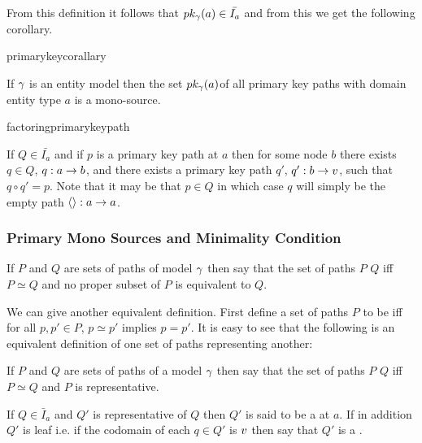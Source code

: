 From this definition it follows that $pk_{\gamma}(a) \in \bar{I_a}$ and from this we get the following corollary.

primarykeycorallary
\begin{corollary}
If $\gamma$ is an entity model then the set $pk_{\gamma}(a)$of all primary key paths 
with domain entity type $a$ is a mono-source.
\end{corollary}

factoringprimarykeypath
\begin{observation}
If $Q \in \bar{I_a}$ and if $p$ is a primary key path at $a$ then for some node $b$ there exists $q \in Q$, $q: a \rightarrow b$, and there exists 
a primary key path $q'$, $q': b \rightarrow v$,  such that $q \circ q' = p$. 
Note that it may be that $p \in Q$ in which case $q$ will simply be the empty path $\langle\rangle:a \rightarrow a$.
\end{observation}

\subsubsection{Primary Mono Sources and Minimality Condition}

\begin{definition}
If $P$ and $Q$ are sets of paths of model $\gamma$ then say that the set of paths $P$ 
 $Q$ 
iff $P \simeq Q$ and no proper subset of $P$ is equivalent to $Q$. 
\end{definition}

We can give another equivalent definition. First define
a set of paths $P$ to be  iff for all $p,p' \in P$,
$p \simeq p'$ implies $p=p'$. It is easy to see that the following is an equivalent definition of one set of paths representing another:

\begin{definition}
If $P$ and $Q$ are sets of paths of a model $\gamma$ then 
say that the set of paths $P$  $Q$ iff $P \simeq Q$ and $P$ is representative. 
\end{definition}

\begin{definition}
If $Q \in \bar{I}_a$ and $Q'$ is representative of $Q$ then $Q'$ is said to be
a  at $a$. If in addition $Q'$ is leaf i.e. if the codomain of each $q \in Q'$ is $v$ then say that $Q'$ is a 
.
\end{definition}

